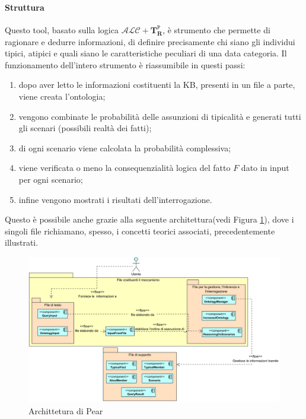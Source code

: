 \paragraph{Struttura}
Questo tool, basato sulla logica $ \mathcal{ALC} + \mathbf{T}_{\mathbf{R}}^{\mathtt{P}} $, è strumento 
che permette di ragionare e dedurre informazioni, di definire 
precisamente chi siano gli individui tipici, atipici e quali siano
le caratteristiche peculiari di una data categoria.
Il funzionamento dell'intero strumento è riassumibile in questi passi:
\begin{enumerate}
	\item dopo aver letto le informazioni costituenti la KB, presenti in un file a parte, 
	viene creata l’ontologia;
	\item vengono combinate le probabilità delle assunzioni di tipicalità e generati tutti 
	gli scenari (possibili realtà dei fatti);
	\item di ogni scenario viene calcolata la probabilità complessiva;
	\item viene verificata o meno la consequenzialità logica del fatto $ F $ dato in input per ogni scenario;
	\item infine vengono mostrati i risultati dell'interrogazione.
\end{enumerate}
Questo è possibile anche grazie alla seguente architettura(vedi Figura \ref{fig:schemaPEAR}), dove i singoli file richiamano, spesso, i concetti teorici associati, precedentemente illustrati.
\begin{figure}[ht]
	\centering
	\includegraphics[width=\linewidth]{immagini/architetturaPEAR.png}
	\caption{Archittetura di Pear}
	\label{fig:schemaPEAR}
\end{figure}

